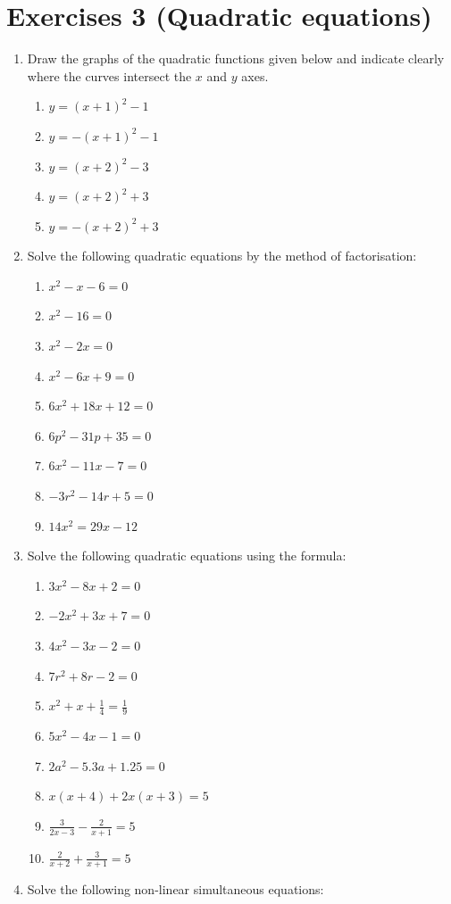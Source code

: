 \documentclass[
  12pt,
  oneside]{book}
\providecommand{\tightlist}{%
  \setlength{\itemsep}{0pt}\setlength{\parskip}{0pt}}
\theoremstyle{definition}
\theoremstyle{definition}
\theoremstyle{definition}
\theoremstyle{definition}
\theoremstyle{remark}
\begin{document}
\hypertarget{exercises-3-quadratic-equations}{%
\chapter*{Exercises 3 (Quadratic equations)}\label{exercises-3-quadratic-equations}}

\begin{enumerate}
\def\labelenumi{\arabic{enumi}.}
\item
  Draw the graphs of the quadratic functions given below and indicate clearly where the curves intersect the \(x\) and \(y\) axes.

  \begin{enumerate}
  \def\labelenumii{\roman{enumii})}
  \tightlist
  \item
    \(y=(x+1)^2-1\)
  \item
    \(y=-(x+1)^2-1\)
  \item
    \(y=(x+2)^2-3\)
  \item
    \(y=(x+2)^2+3\)
  \item
    \(y=-(x+2)^2+3\)
  \end{enumerate}
\item
  Solve the following quadratic equations by the method of factorisation:

  \begin{enumerate}
  \def\labelenumii{\roman{enumii})}
  \tightlist
  \item
    \(x^2-x-6=0\)
  \item
    \(x^2-16=0\)
  \item
    \(x^2-2x=0\)
  \item
    \(x^2-6x+9=0\)
  \item
    \(6x^2+18x+12=0\)
  \item
    \(6p^2-31p+35=0\)
  \item
    \(6x^2-11x-7=0\)
  \item
    \(-3r^2-14r+5=0\)
  \item
    \(14x^2=29x-12\)
  \end{enumerate}
\item
  Solve the following quadratic equations using the formula:

  \begin{enumerate}
  \def\labelenumii{\roman{enumii})}
  \tightlist
  \item
    \(3x^2-8x+2=0\)
  \item
    \(-2x^2+3x+7=0\)
  \item
    \(4x^2-3x-2=0\)
  \item
    \(7r^2+8r-2=0\)
  \item
    \(x^2+x+\frac14=\frac19\)
  \item
    \(5x^2-4x-1=0\)
  \item
    \(2a^2-5.3a+1.25=0\)
  \item
    \(x(x+4)+2x(x+3)=5\)
  \item
    \(\frac{3}{2x-3}-\frac{2}{x+1}=5\)
  \item
    \(\frac{2}{x+2}+\frac{3}{x+1}=5\)
  \end{enumerate}
\item
  Solve the following non-linear simultaneous equations:


\end{enumerate}
\end{document}
